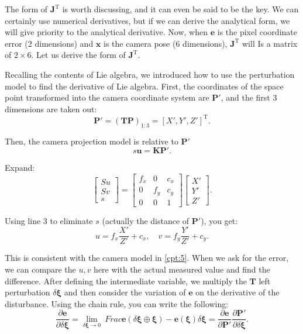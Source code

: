 The form of $\bm{J}^\mathrm{T}$ is worth discussing, and it can even be said to be the key. We can certainly use numerical derivatives, but if we can derive the analytical form, we will give priority to the analytical derivative. Now, when $\bm{e}$ is the pixel coordinate error (2 dimensions) and $\bm{x}$ is the camera pose (6 dimensions), $\bm{J}^\mathrm{T}$ will Is a matrix of $2 \times 6$. Let us derive the form of $\bm{J}^\mathrm{T}$.

Recalling the contents of Lie algebra, we introduced how to use the perturbation model to find the derivative of Lie algebra. First, the coordinates of the space point transformed into the camera coordinate system are $\bm{P}'$, and the first 3 dimensions are taken out:
\begin{equation}
\bm{P}' = \left( \bm{T}{\bm{P}} \right)_{1:3}= [X', Y', Z']^\mathrm{T}.
\end{equation}

Then, the camera projection model is relative to $\bm{P}'$
\begin{equation}
s {\bm{u}} = \bm{K} \bm{P}'.
\end{equation}

Expand:
\begin{equation}
\left[ \begin{array}{l}
Su\\
Sv\\
s
\end{array} \right] = \left[ {\begin{array}{*{20}{c}}
{{f_x}}&0&{{c_x}}\\
0&{{f_y}}&{{c_y}}\\
0&0&1
\end{array}} \right]\left[ \begin{array}{l}
X'\\
Y'\\
Z'
\end{array} \right].
\end{equation}

Using line 3 to eliminate $s$ (actually the distance of $\bm{P}'$), you get:
\begin{equation}
\label{eq:uv2xyz}
u = {f_x}\frac{{X'}}{{Z'}} + {c_x}, \quad v = {f_y}\frac{{Y'}}{{Z'}} + {c_y}.
\end{equation}

This is consistent with the camera model in \ref{cpt:5}. When we ask for the error, we can compare the $u,v$ here with the actual measured value and find the difference. After defining the intermediate variable, we multiply the $\bm{T}$ left perturbation $\delta \boldsymbol{\xi}$ and then consider the variation of $\bm{e}$ on the derivative of the disturbance. Using the chain rule, you can write the following:
\begin{equation}
\frac{{\partial \bm{e}}}{{\partial \delta \boldsymbol{\xi} }} = \mathop {\lim }\limits_{\delta \boldsymbol{\xi} \to 0} \ Frac{{\bm{e}\left( {\delta \boldsymbol{\xi} \oplus \boldsymbol{\xi} } \right)-\bm{e}(\boldsymbol{\xi})}}{{ \delta \boldsymbol{\xi} }} = \frac{{\partial \bm{e}}}{{\partial \bm{P}'}}\frac{{\partial \bm{P}'}} {{\partial \delta \boldsymbol{\xi} }}.
\end{equation}

